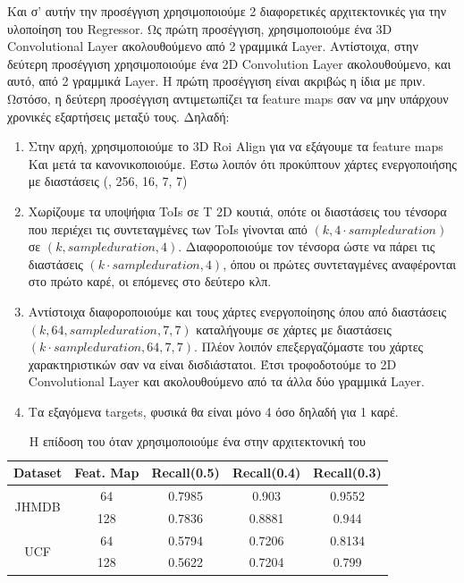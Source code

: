 Και σ' αυτήν την προσέγγιση χρησιμοποιούμε 2 διαφορετικές αρχιτεκτονικές για την υλοποίηση του \en Regressor\gr.
Ως πρώτη προσέγγιση, χρησιμοποιούμε ένα \en 3D Convolutional Layer \gr ακολουθούμενο από 2 γραμμικά \en Layer\gr. Aντίστοιχα, στην δεύτερη προσέγγιση χρησιμοποιούμε ένα \en 2D
Convolution Layer \gr ακολουθούμενο, και αυτό, από 2 γραμμικά \en Layer\gr. H πρώτη προσέγγιση είναι ακριβώς η ίδια με πριν. Ωστόσο, η δεύτερη προσέγγιση
αντιμετωπίζει τα \en feature maps \gr σαν να μην υπάρχουν χρονικές εξαρτήσεις μεταξύ τους. Δηλαδή:
\begin{enumerate}
\item Στην αρχή, χρησιμοποιούμε το \en 3D Roi Align \gr για να εξάγουμε τα \en feature maps \gr Και μετά τα κανονικοποιούμε. Έστω λοιπόν ότι προκύπτουν  χάρτες ενεργοποιήσης
  με διαστάσεις (, 256, 16, 7, 7)
\item Χωρίζουμε τα υποψήφια \en ToIs \gr σε \en T 2D \gr κουτιά, οπότε οι διαστάσεις του τένσορα που περιέχει τις συντεταγμένες των \en ToIs \gr γίνονται από $(k,4\cdot sample duration)$
  σε $(k,sample duration, 4)$. Διαφοροποιούμε τον τένσορα ώστε να πάρει τις διαστάσεις  $(k\cdot sample duration, 4)$, όπου οι πρώτες  συντεταγμένες αναφέρονται
  στο πρώτο καρέ, οι επόμενες  στο δεύτερο κλπ.
\item Αντίστοιχα διαφοροποιούμε και τους χάρτες ενεργοποίησης όπου από διαστάσεις $(k, 64, sample duration, 7, 7)$ καταλήγουμε σε χάρτες με διαστάσεις $(k\cdot sample duration, 64, 7, 7)$.
  Πλέον λοιπόν επεξεργαζόμαστε του χάρτες χαρακτηριστικών σαν να είναι δισδιάστατοι. Έτσι τροφοδοτούμε το \en 2D Convolutional Layer \gr και ακολουθούμενο από τα άλλα δύο γραμμικά \en Layer\gr.
  \item Τα εξαγόμενα \en targets\gr, φυσικά θα είναι μόνο 4 όσο δηλαδή για 1 καρέ.
\end{enumerate}

\en
\begin{table}[h]
  \centering
  \begin{tabular}{||c | c || c  c  c||}
    \hline
    \textbf{Dataset} & \textbf{Feat. Map} & \textbf{Recall(0.5)} & \textbf{Recall(0.4)} & \textbf{Recall(0.3)}\\
    \hline
    \multirow{2}{*}{JHMDB} &  64 & 0.7985 & 0.903 & 0.9552 \\
    \cline{2-5}
    {} & 128 & 0.7836 & 0.8881 & 0.944\\
    \hline
    \multirow{2}{*}{UCF}  & 64 & 0.5794 & 0.7206 & 0.8134 \\
    \cline{2-5}
    {} & 128 & 0.5622 & 0.7204 & 0.799 \\
    \hline

  \end{tabular}
  \caption{\gr Η επίδοση του  όταν χρησιμοποιούμε ένα  στην
    αρχιτεκτονική του }
  \label{table:gr_reg_2_1}
\end{table}
\gr
\en

